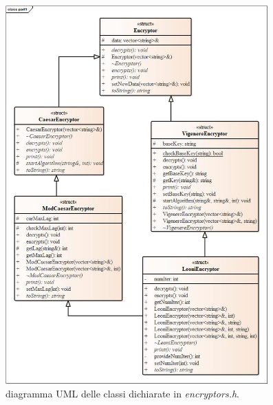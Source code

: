 \documentclass[a4paper, 12pt, one column, aas_macros]{article}
\begin{document}
	\begin{figure}[t!]
		\centering
		\includegraphics[height=550px]{UML/UML_1.jpg}
		\caption{diagramma UML delle classi dichiarate in \textit{encryptors.h}.}
		\label{UML_1}
	\end{figure}
\end{document}
